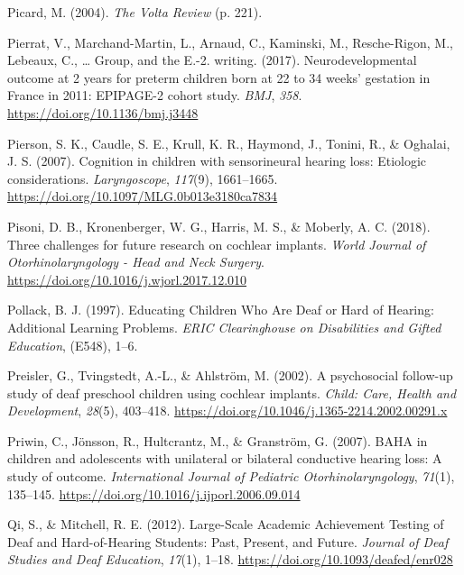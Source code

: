 \documentclass[english,man]{apa6}
\begin{document}
\leavevmode\hypertarget{ref-picard2004}{}%
Picard, M. (2004). \emph{The Volta Review} (p. 221).

\leavevmode\hypertarget{ref-pierrat2017}{}%
Pierrat, V., Marchand-Martin, L., Arnaud, C., Kaminski, M., Resche-Rigon, M., Lebeaux, C., \ldots{} Group, and the E.-2. writing. (2017). Neurodevelopmental outcome at 2 years for preterm children born at 22 to 34 weeks' gestation in France in 2011: EPIPAGE-2 cohort study. \emph{BMJ}, \emph{358}. \url{https://doi.org/10.1136/bmj.j3448}

\leavevmode\hypertarget{ref-pierson2007}{}%
Pierson, S. K., Caudle, S. E., Krull, K. R., Haymond, J., Tonini, R., \& Oghalai, J. S. (2007). Cognition in children with sensorineural hearing loss: Etiologic considerations. \emph{Laryngoscope}, \emph{117}(9), 1661--1665. \url{https://doi.org/10.1097/MLG.0b013e3180ca7834}

\leavevmode\hypertarget{ref-pisoni2018}{}%
Pisoni, D. B., Kronenberger, W. G., Harris, M. S., \& Moberly, A. C. (2018). Three challenges for future research on cochlear implants. \emph{World Journal of Otorhinolaryngology - Head and Neck Surgery}. \url{https://doi.org/10.1016/j.wjorl.2017.12.010}

\leavevmode\hypertarget{ref-pollack1997}{}%
Pollack, B. J. (1997). Educating Children Who Are Deaf or Hard of Hearing: Additional Learning Problems. \emph{ERIC Clearinghouse on Disabilities and Gifted Education}, (E548), 1--6.

\leavevmode\hypertarget{ref-preisler2002}{}%
Preisler, G., Tvingstedt, A.-L., \& Ahlström, M. (2002). A psychosocial follow-up study of deaf preschool children using cochlear implants. \emph{Child: Care, Health and Development}, \emph{28}(5), 403--418. \url{https://doi.org/10.1046/j.1365-2214.2002.00291.x}

\leavevmode\hypertarget{ref-priwin2007}{}%
Priwin, C., Jönsson, R., Hultcrantz, M., \& Granström, G. (2007). BAHA in children and adolescents with unilateral or bilateral conductive hearing loss: A study of outcome. \emph{International Journal of Pediatric Otorhinolaryngology}, \emph{71}(1), 135--145. \url{https://doi.org/10.1016/j.ijporl.2006.09.014}

\leavevmode\hypertarget{ref-qi2012}{}%
Qi, S., \& Mitchell, R. E. (2012). Large-Scale Academic Achievement Testing of Deaf and Hard-of-Hearing Students: Past, Present, and Future. \emph{Journal of Deaf Studies and Deaf Education}, \emph{17}(1), 1--18. \url{https://doi.org/10.1093/deafed/enr028}
\end{document}
